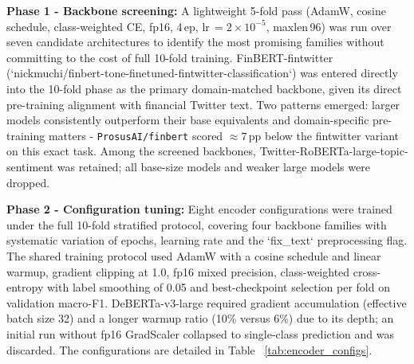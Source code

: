 \documentclass[11pt,a4paper]{article}
\begin{document}
\textbf{Phase 1 - Backbone screening:} A lightweight 5-fold pass
(AdamW, cosine schedule, class-weighted CE, fp16, 4\,ep, lr\,$=2\!\times\!10^{-5}$,
maxlen\,96) was run over seven candidate architectures to identify the most promising families without committing to the cost of full 10-fold training. FinBERT-fintwitter (`nickmuchi/finbert-tone-finetuned-fintwitter-classification`) was entered directly into the 10-fold phase as the primary domain-matched backbone, given its direct pre-training alignment with financial Twitter text.
Two patterns emerged: larger models consistently outperform their base equivalents and
domain-specific pre-training matters - \texttt{ProsusAI/finbert} scored $\approx7$\,pp
below the fintwitter variant on this exact task. Among the screened backbones, Twitter-RoBERTa-large-topic-sentiment was retained;
all base-size models and weaker large models were dropped.

\textbf{Phase 2 - Configuration tuning:} Eight encoder configurations were trained under the full 10-fold stratified protocol, covering four backbone families with systematic variation of epochs, learning rate and the `fix\_text` preprocessing flag. The shared training protocol used AdamW with a cosine schedule and linear warmup, gradient clipping at 1.0, fp16 mixed precision, class-weighted cross-entropy with label smoothing of 0.05 and best-checkpoint selection per fold on validation macro-F1. DeBERTa-v3-large required gradient accumulation (effective batch size 32) and a longer warmup ratio (10\% versus 6\%) due to its depth; an initial run without fp16 GradScaler collapsed to single-class prediction and was discarded. The configurations are detailed in Table ~\ref{tab:encoder_configs}.
\end{document}
